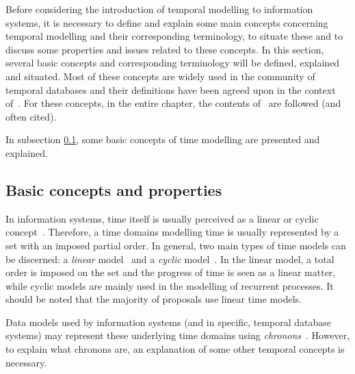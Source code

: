 %
%
Before considering the introduction of temporal modelling to information systems, it is necessary to define and explain some main concepts concerning temporal modelling and their corresponding terminology, to situate these and to discuss some properties and issues related to these concepts. In this section, several basic concepts and corresponding terminology will be defined, explained and situated. Most of these concepts are widely used in the community of temporal databases and their definitions have been agreed upon in the context of~\cite{Dyreson1994}. For these concepts, in the entire chapter, the contents of~\cite{Dyreson1994} are followed (and often cited).

In subsection \ref{subsec:basic-concepts}, some basic concepts of time modelling are presented and explained.




\subsection{Basic concepts and properties}
\label{subsec:basic-concepts}
In information systems, time itself is usually perceived as a linear or cyclic concept~\cite{Jensen94thetsql2}. Therefore, a time domains modelling time is usually represented by a set with an imposed partial order. In general, two main types of time models can be discerned: a \emph{linear} model~\cite{benthem82} and a \emph{cyclic} model~\cite{lorentzos88}. In the linear model, a total order is imposed on the set and the progress of time is seen as a linear matter, while cyclic models are mainly used in the modelling of recurrent processes. It should be noted that the majority of proposals use linear time models.

Data models used by information systems (and in specific, temporal database systems) may represent these underlying time domains using \emph{chronons}~\cite{Dyreson1994}. However, to explain what chronons are, an explanation of some other temporal concepts is necessary.

